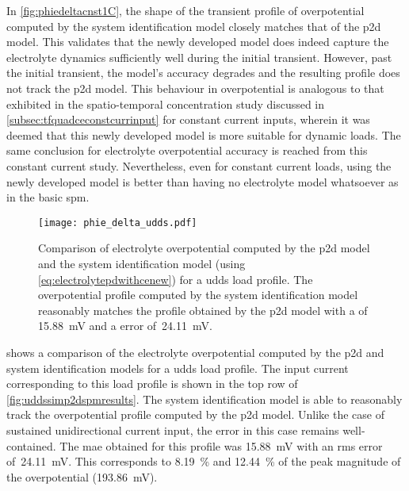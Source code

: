 In \cref{fig:phiedeltacnst1C},   the  shape   of   the   transient  profile   of
overpotential  computed  by  the  system identification  model  closely  matches
that  of the  \gls{p2d} model.  This validates  that the  newly developed  model
does  indeed  capture the  electrolyte  dynamics  sufficiently well  during  the
initial transient.  However, past  the initial  transient, the  model's accuracy
degrades and  the resulting  profile does  not track  the \gls{p2d}  model. This
behaviour in overpotential is analogous to that exhibited in the spatio-temporal
concentration   study   discussed  in \cref{subsec:tfquadceconstcurrinput}   for
constant current inputs,  wherein it was deemed that this  newly developed model
is  more  suitable  for  dynamic  loads. The  same  conclusion  for  electrolyte
overpotential   accuracy  is   reached   from  this   constant  current   study.
Nevertheless, even for  constant current loads, using the  newly developed model
is better than having no electrolyte model whatsoever as in the basic \gls{spm}.

\begin{figure}[!htbp]
    \centering
    \texttt{[image: phie\_delta\_udds.pdf]}
    \caption[%
    Electrolyte  overpotential  computed  by the    and  system
    identification models for a  load profile
    ]%
    {%
        Comparison    of    electrolyte    overpotential   computed    by    the
        \gls{p2d}     model    and     the    system     identification    model
        (using \cref{eq:electrolytepdwithcenew}) for a  \gls{udds} load profile.
        The overpotential  profile computed  by the system  identification model
        reasonably matches  the profile obtained  by the \gls{p2d} model  with a
         of \SI{15.88}{\milli\volt} and  a  error of~\SI{24.11}{\milli\volt}.
    }%
    \label{fig:phiedeltacnstudds}
\end{figure}

 shows a comparison of the electrolyte overpotential
computed by the \gls{p2d} and system identification models for a \gls{udds} load
profile. The  input current corresponding to  this load profile is  shown in the
top row  of \cref{fig:uddssimp2dspmresults}. The system  identification model is
able to  reasonably track  the overpotential profile  computed by  the \gls{p2d}
model. Unlike the  case of sustained unidirectional current input,  the error in
this case  remains well-contained. The  \gls{mae} obtained for this  profile was
\SI{15.88}{\milli\volt}  with  an  \gls{rms}  error  of~\SI{24.11}{\milli\volt}.
This  corresponds to  \SI{8.19}{\percent} and  \SI{12.44}{\percent} of  the peak
magnitude of the overpotential (\SI{193.86}{\milli\volt}).

